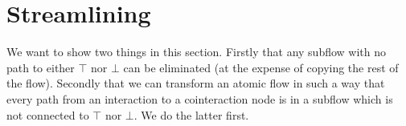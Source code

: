 \documentclass[a4paper]{amsart}
\newtheorem{lem}[thm]{Lemma}
\newtheorem{pro}[thm]{Proposition}
\theoremstyle{remark}
\theoremstyle{definition}
\begin{document}




\section{Streamlining}

We want to show two things in this section. Firstly that any subflow with no path to either $\top$ nor $\bot$ can be eliminated (at the expense of copying the rest of the flow). Secondly that we can transform an atomic flow in such a way that every path from an interaction to a cointeraction node is in a subflow which is not connected to $\top$ nor $\bot$. We do the latter first.
\end{document}
